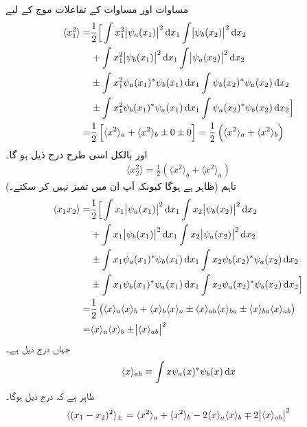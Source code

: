  مساوات  اور مساوات  کے تفاعلات موج کے لیے 
\begin{gather*}
	\begin{aligned}
		\langle x_1^2 \rangle =& \frac{1}{2}\Big[\int x_1^2\abs{\psi_a(x_1)}^2\dif x_1\int\abs{\psi_b(x_2)}^2\dif x_2 \\
		&+ \int x_1^2\abs{\psi_b(x_1)}^2\dif x_1\int\abs{\psi_a(x_2)}^2\dif x_2 \\
		&\pm\int x_1^2\psi_a(x_1)^*\psi_b(x_1)\dif x_1\int\psi_b(x_2)^*\psi_a(x_2)\dif x_2 \\
		&\pm\int x_1^2\psi_b(x_1)^*\psi_a(x_1)\dif x_1\int\psi_a(x_2)^*\psi_b(x_2)\dif x_2\Big] \\
		=& \frac{1}{2}\left[\langle x^2 \rangle_a+\langle x^2 \rangle_b\pm0\pm0\right]=\frac{1}{2}\left(\langle x^2 \rangle_a+\langle x^2\rangle_b\right)
	\end{aligned}
\end{gather*}
اور بالکل اسی طرح درج ذیل ہو گا۔
\begin{align*}
	\langle x_2^2 \rangle=\frac{1}{2}\left(\langle x^2 \rangle_b+\langle x^2 \rangle_a\right)
\end{align*}
(ظاہر ہے  ہوگا کیونکہ آپ ان میں تمیز نہیں کر سکتے۔) تاہم
\begin{gather*}
	\begin{aligned}
		\langle x_1x_2 \rangle=&\frac{1}{2}\Big[\int x_1\abs{\psi_a(x_1)}^2\dif x_1\int x_2\abs{\psi_b(x_2)}^2\dif x_2 \\
		&+\int x_1\abs{\psi_b(x_1)}^2\dif x_1\int x_2\abs{\psi_a(x_2)}^2\dif x_2 \\
		&\pm\int x_1\psi_a(x_1)^*\psi_b(x_1)\dif x_1\int x_2\psi_b(x_2)^*\psi_a(x_2)\dif x_2 \\
		&\pm\int x_1\psi_b(x_1)^*\psi_a(x_1)\dif x_1\int x_2\psi_a(x_2)^*\psi_b(x_2)\dif x_2\Big] \\
		=& \frac{1}{2}\left(\langle x \rangle_a\langle x \rangle_b+\langle x \rangle_b\langle x \rangle_a\pm\langle x \rangle_{ab}\langle x \rangle_{ba}\pm\langle x \rangle_{ba}\langle x \rangle_{ab}\right)\\
		=&\langle x \rangle_a\langle x \rangle_b\pm\abs{\langle x \rangle_{ab}}^2
	\end{aligned}
\end{gather*}
 جہاں درج ذیل ہے۔
\begin{align}\label{مساوات_متماثل_کے_بیچ}
	\langle x \rangle_{ab}\equiv\int x\psi_a(x)^*\psi_b(x)\dif x
\end{align}
ظاہر ہے کہ درج ذیل ہوگا۔
\begin{align}\label{مساوات_متماثل_فاصلہ_متماثل}
	\langle(x_1-x_2)^2\rangle_{\pm}=\langle x^2\rangle_a+\langle x^2 \rangle_b-2\langle x \rangle_a\langle x \rangle_b\mp2\abs{\langle x \rangle_{ab}}^2
\end{align}

